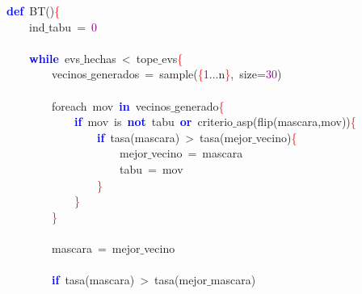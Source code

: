 \noindent
\mbox{}\textbf{\textcolor{Blue}{def}}\ BT\textcolor{BrickRed}{()}\textcolor{Red}{\{} \\
\mbox{}\ \ \ \ ind$\_$tabu\ \textcolor{BrickRed}{=}\ \textcolor{Purple}{0} \\
\mbox{} \\
\mbox{}\ \ \ \ \textbf{\textcolor{Blue}{while}}\ evs$\_$hechas\ \textcolor{BrickRed}{\textless{}}\ tope$\_$evs\textcolor{Red}{\{} \\
\mbox{}\ \ \ \ \ \ \ \ vecinos$\_$generados\ \textcolor{BrickRed}{=}\ sample\textcolor{BrickRed}{(}\textcolor{Red}{\{}\textcolor{Purple}{1}\textcolor{BrickRed}{...}n\textcolor{Red}{\}}\textcolor{BrickRed}{,}\ size\textcolor{BrickRed}{=}\textcolor{Purple}{30}\textcolor{BrickRed}{)} \\
\mbox{} \\
\mbox{}\ \ \ \ \ \ \ \ foreach\ mov\ \textbf{\textcolor{Blue}{in}}\ vecinos$\_$generado\textcolor{Red}{\{} \\
\mbox{}\ \ \ \ \ \ \ \ \ \ \ \ \textbf{\textcolor{Blue}{if}}\ mov\ is\ \textbf{\textcolor{Blue}{not}}\ tabu\ \textbf{\textcolor{Blue}{or}}\ criterio$\_$asp\textcolor{BrickRed}{(}flip\textcolor{BrickRed}{(}mascara\textcolor{BrickRed}{,}mov\textcolor{BrickRed}{))}\textcolor{Red}{\{} \\
\mbox{}\ \ \ \ \ \ \ \ \ \ \ \ \ \ \ \ \textbf{\textcolor{Blue}{if}}\ tasa\textcolor{BrickRed}{(}mascara\textcolor{BrickRed}{)}\ \textcolor{BrickRed}{\textgreater{}}\ tasa\textcolor{BrickRed}{(}mejor$\_$vecino\textcolor{BrickRed}{)}\textcolor{Red}{\{} \\
\mbox{}\ \ \ \ \ \ \ \ \ \ \ \ \ \ \ \ \ \ \ \ mejor$\_$vecino\ \textcolor{BrickRed}{=}\ mascara \\
\mbox{}\ \ \ \ \ \ \ \ \ \ \ \ \ \ \ \ \ \ \ \ tabu\ \textcolor{BrickRed}{=}\ mov \\
\mbox{}\ \ \ \ \ \ \ \ \ \ \ \ \ \ \ \ \textcolor{Red}{\}} \\
\mbox{}\ \ \ \ \ \ \ \ \ \ \ \ \textcolor{Red}{\}} \\
\mbox{}\ \ \ \ \ \ \ \ \textcolor{Red}{\}} \\
\mbox{} \\
\mbox{}\ \ \ \ \ \ \ \ mascara\ \textcolor{BrickRed}{=}\ mejor$\_$vecino \\
\mbox{} \\
\mbox{}\ \ \ \ \ \ \ \ \textbf{\textcolor{Blue}{if}}\ tasa\textcolor{BrickRed}{(}mascara\textcolor{BrickRed}{)}\ \textcolor{BrickRed}{\textgreater{}}\ tasa\textcolor{BrickRed}{(}mejor$\_$mascara\textcolor{BrickRed}{)} \\

